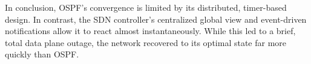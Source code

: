 \documentclass[12pt]{article}
\begin{document}
In conclusion, OSPF's convergence is limited by its distributed, timer-based design. In contrast, the SDN controller's centralized global view and event-driven notifications allow it to react almost instantaneously. While this led to a brief, total data plane outage, the network recovered to its optimal state far more quickly than OSPF.
\end{document}
